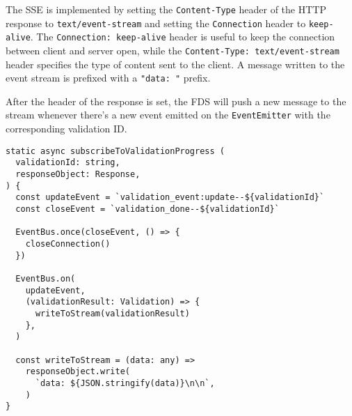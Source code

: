     The SSE is implemented by setting the \verb;Content-Type; header of the HTTP response to \verb;text/event-stream; and setting the \verb;Connection; header to \verb;keep-alive;. The \verb;Connection: keep-alive; header is useful to keep the connection between client and server open, while the \verb;Content-Type: text/event-stream; header specifies the type of content sent to the client. A message written to the event stream is prefixed with a \verb;"data: "; prefix. 

    After the header of the response is set, the FDS will push a new message to the stream whenever there's a new event emitted on the \verb;EventEmitter; with the corresponding validation ID. 

    \begin{lstlisting}[style=es6, caption={Writing to SSE stream when certain events are published (TypeScript)}]
static async subscribeToValidationProgress (
  validationId: string,
  responseObject: Response,
) {
  const updateEvent = `validation_event:update--${validationId}`
  const closeEvent = `validation_done--${validationId}`

  EventBus.once(closeEvent, () => {
    closeConnection()
  })

  EventBus.on(
    updateEvent,
    (validationResult: Validation) => {
      writeToStream(validationResult)
    },
  )

  const writeToStream = (data: any) =>
    responseObject.write(
      `data: ${JSON.stringify(data)}\n\n`,
    )
}
\end{lstlisting}

